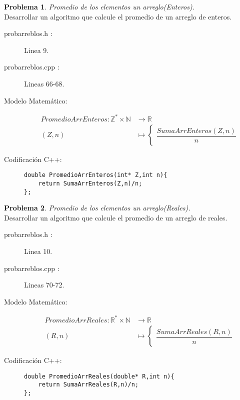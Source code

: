 \documentclass{article}
\theoremstyle{plain}
\theoremstyle{definition}
\newtheorem{problem}{Problema}
\begin{document}
\begin{problem} \emph{Promedio de los elementos un arreglo(Enteros).}\\
\hspace*{7mm}Desarrollar un algoritmo que calcule el promedio de un arreglo de enteros.
\begin{description}
\item[probarreblos.h :] Linea 9. \item[probarreblos.cpp :] Lineas 66-68.

\item[Modelo Matemático:]
\begin{align*}
PromedioArrEnteros: \mathbb{Z}^{*}\times\mathbb{N} &\to \mathbb{R}\\
(Z,n) &\mapsto
\begin{cases}
\dfrac{SumaArrEnteros(Z,n)}{n}
\end{cases}
\end{align*}
%
\item[Codificación \textsf{C++}:]\hfill
%
\begin{verbatim}
double PromedioArrEnteros(int* Z,int n){
    return SumaArrEnteros(Z,n)/n;
};
\end{verbatim}
\end{description}
\end{problem}

\begin{problem} \emph{Promedio de los elementos un arreglo(Reales).}\\
\hspace*{7mm}Desarrollar un algoritmo que calcule el promedio de un arreglo de reales.
\begin{description}
\item[probarreblos.h :] Linea 10. \item[probarreblos.cpp :] Lineas 70-72.

\item[Modelo Matemático:]
\begin{align*}
PromedioArrReales: \mathbb{R}^{*}\times\mathbb{N} &\to \mathbb{R}\\
(R,n) &\mapsto
\begin{cases}
\dfrac{SumaArrReales(R,n)}{n}
\end{cases}
\end{align*}
%
\item[Codificación \textsf{C++}:]\hfill
%
\begin{verbatim}
double PromedioArrReales(double* R,int n){
    return SumaArrReales(R,n)/n;
};
\end{verbatim}
\end{description}
\end{problem}
\end{document}
